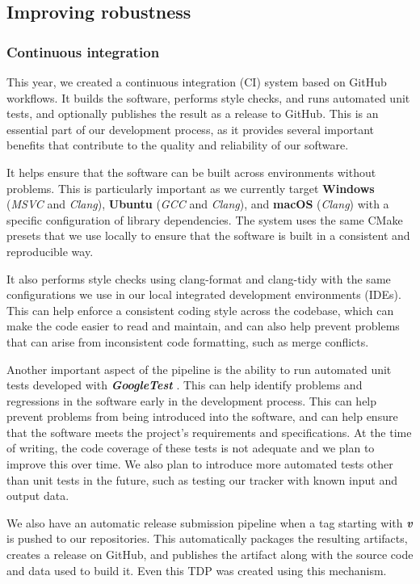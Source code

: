 \documentclass[runningheads]{llncs}
\begin{document}
\subsection{Improving robustness}

\subsubsection{Continuous integration}
This year, we created a continuous integration (CI) system based on GitHub workflows. It builds the software, performs style checks, and runs automated unit tests, and optionally publishes the result as a release to GitHub. This is an essential part of our development process, as it provides several important benefits that contribute to the quality and reliability of our software.

\indent It helps ensure that the software can be built across environments without problems. This is particularly important as we currently target \textbf{Windows} (\textit{MSVC} and \textit{Clang}), \textbf{Ubuntu} (\textit{GCC} and \textit{Clang}), and \textbf{macOS} (\textit{Clang}) with a specific configuration of library dependencies. The system uses the same CMake presets that we use locally to ensure that the software is built in a consistent and reproducible way.

\indent It also performs style checks using clang-format and clang-tidy with the same configurations we use in our local integrated development environments (IDEs). This can help enforce a consistent coding style across the codebase, which can make the code easier to read and maintain, and can also help prevent problems that can arise from inconsistent code formatting, such as merge conflicts.

\indent Another important aspect of the pipeline is the ability to run automated unit tests developed with \textbf{\textit{GoogleTest}} \cite{ref_3rd-party_gtest}. This can help identify problems and regressions in the software early in the development process. This can help prevent problems from being introduced into the software, and can help ensure that the software meets the project's requirements and specifications. At the time of writing, the code coverage of these tests is not adequate and we plan to improve this over time. We also plan to introduce more automated tests other than unit tests in the future, such as testing our tracker with known input and output data.

\indent We also have an automatic release submission pipeline when a tag starting with \textbf{\textit{v}} is pushed to our repositories. This automatically packages the resulting artifacts, creates a release on GitHub, and publishes the artifact along with the source code and data used to build it. Even this TDP was created using this mechanism.
\end{document}
